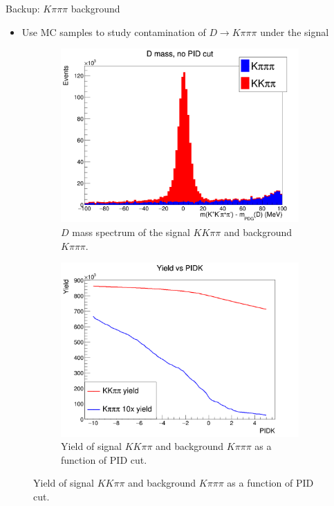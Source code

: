 \documentclass{beamer}
\begin{document}
\begin{frame}{Backup: $K\pi\pi\pi$ background}
  \begin{itemize}
    \setlength\itemsep{1.3em}
    \item{Use MC samples to study contamination of $D\to K\pi\pi\pi$ under the signal}
  \end{itemize}
  \begin{figure}
    \centering
    \begin{subfigure}{0.5\textwidth}
      \centering
      \includegraphics[width = 1.0\textwidth]{../Report/Plots/B2DK_Dmass_Background.png}
      \caption{$D$ mass spectrum of the signal $KK\pi\pi$ and background $K\pi\pi\pi$.}
    \end{subfigure}%
    \begin{subfigure}{0.5\textwidth}
      \centering
      \includegraphics[width = 1.0\textwidth]{../Report/Plots/YieldVSPIDK.png}
      \caption{Yield of signal $KK\pi\pi$ and background $K\pi\pi\pi$ as a function of PID cut.}
    \end{subfigure}
  \end{figure}
\end{frame}
\end{document}
